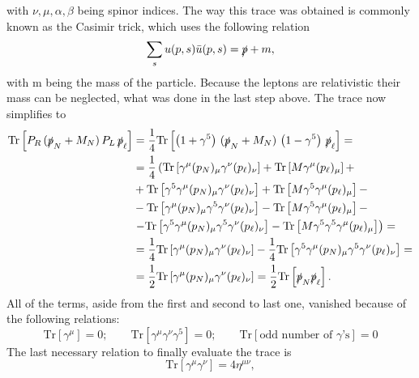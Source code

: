 with $\nu,\mu,\alpha,\beta$ being spinor indices.\newline\indent
The way this trace was obtained is commonly known as the Casimir trick, which uses the following relation
\begin{equation*}
	\sum_s u(p,s)\bar{u}(p,s)=\slashed p +m,
\end{equation*}
with m being the mass of the particle. \newline\indent
Because the leptons are relativistic their mass can be neglected, what was done in the last step above.\newline\indent
The trace now simplifies to
\begin{align*}
	\text{Tr}\left[P_R\,(\slashed p_N+M_N)\, P_L\,\slashed p_\ell\right]&=\frac{1}{4}\text{Tr}\left[\left(1+\gamma^5\right)\,(\slashed p_N+M_N)\,\left(1-\gamma^5\right)\,\slashed p_\ell\right]=\\
	&=\frac{1}{4}\left(\text{Tr}\left[\gamma^\mu (p_N)_\mu \gamma^\nu (p_\ell)_\nu\right]+ \text{Tr}\left[M\gamma^\mu (p_\ell)_\mu\right]+\right.\\ 
	&+\text{Tr}\left[\gamma^5\gamma^\mu (p_N)_\mu\gamma^\nu (p_\ell)_\nu\right]+ \text{Tr}\left[M\gamma^5\gamma^\mu (p_\ell)_\mu\right]-\\
	 &-\text{Tr}\left[\gamma^\mu (p_N)_\mu\gamma^5\gamma^\nu (p_\ell)_\nu\right]- \text{Tr}\left[M\gamma^5\gamma^\mu (p_\ell)_\mu\right]-\\
	  &\left.-\text{Tr}\left[\gamma^5\gamma^\mu (p_N)_\mu\gamma^5\gamma^\nu (p_\ell)_\nu\right]- \text{Tr}\left[M\gamma^5\gamma^5\gamma^\mu (p_\ell)_\mu\right] \right)=\\
	&=\frac{1}{4}\text{Tr}\left[\gamma^\mu (p_N)_\mu\gamma^\nu (p_\ell)_\nu\right]-\frac{1}{4}\text{Tr}\left[\gamma^5\gamma^\mu (p_N)_\mu\gamma^5\gamma^\nu (p_\ell)_\nu\right]=\\
	&=\frac{1}{2}\text{Tr}\left[\gamma^\mu (p_N)_\mu\gamma^\nu (p_\ell)_\nu\right]=\frac{1}{2}\text{Tr}\left[\slashed p_N \slashed p_\ell\right].
\end{align*}
All of the terms, aside from the first and second to last one, vanished because of the following relations:
\begin{equation*}
	\text{Tr}\left[\gamma^\mu\right]=0; \qquad \text{Tr}\left[\gamma^\mu\gamma^\nu\gamma^5\right]=0;\qquad \text{Tr}\left[\text{odd number of $\gamma$'s}\right]=0
\end{equation*}
The last necessary relation to finally evaluate the trace is
\begin{equation*}
	\text{Tr}[\gamma^\mu\gamma^\nu]=4\eta^{\mu\nu},
\end{equation*}

